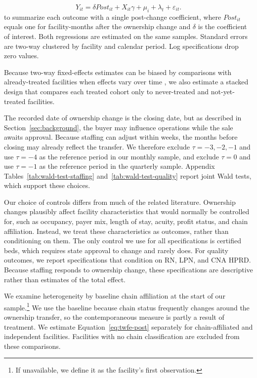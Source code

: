 \documentclass[12pt]{article}
\begin{document}
\begin{equation}
\label{eq:twfe-post}
Y_{it}
=
\delta \textit{Post}_{it}
+
X_{it}\gamma
+
\mu_i
+
\lambda_t
+
\varepsilon_{it}.
\end{equation}
to summarize each outcome with a single post-change coefficient, where \(\textit{Post}_{it}\) equals one for facility-months after the ownership change and \(\delta\) is the coefficient of interest. Both regressions are estimated on the same samples. Standard errors are two-way clustered by facility and calendar period. Log specifications drop zero values.

Because two-way fixed-effects estimates can be biased by comparisons with already-treated facilities when effects vary over time \citep{goodman_bacon_2021}, we also estimate a stacked design that compares each treated cohort only to never-treated and not-yet-treated facilities.

The recorded date of ownership change is the closing date, but as described in Section~\ref{sec:background}, the buyer may influence operations while the sale awaits approval. Because staffing can adjust within weeks, the months before closing may already reflect the transfer. We therefore exclude \(\tau=-3,-2,-1\) and use \(\tau=-4\) as the reference period in our monthly sample, and exclude \(\tau=0\) and use \(\tau=-1\) as the reference period in the quarterly sample. Appendix Tables~\ref{tab:wald-test-staffing} and~\ref{tab:wald-test-quality} report joint Wald tests, which support these choices.

Our choice of controls differs from much of the related literature. Ownership changes plausibly affect facility characteristics that would normally be controlled for, such as occupancy, payer mix, length of stay, acuity, profit status, and chain affiliation. Instead, we treat these characteristics as outcomes, rather than conditioning on them. The only control we use for all specifications is certified beds, which requires state approval to change and rarely does. For quality outcomes, we report specifications that condition on RN, LPN, and CNA HPRD. Because staffing responds to ownership change, these specifications are descriptive rather than estimates of the total effect.

We examine heterogeneity by baseline chain affiliation at the start of our sample.\footnote{If unavailable, we define it as the facility's first observation.} We use the baseline because chain status frequently changes around the ownership transfer, so the contemporaneous measure is partly a result of treatment. We estimate Equation~\ref{eq:twfe-post} separately for chain-affiliated and independent facilities. Facilities with no chain classification are excluded from these comparisons.
\end{document}
